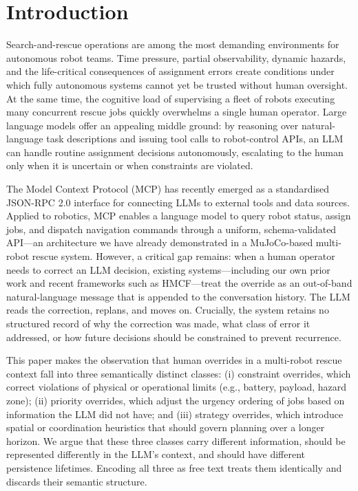 \section{Introduction}

Search-and-rescue operations are among the most demanding environments for autonomous robot teams. Time pressure, partial observability, dynamic hazards, and the life-critical consequences of assignment errors create conditions under which fully autonomous systems cannot yet be trusted without human oversight. At the same time, the cognitive load of supervising a fleet of robots executing many concurrent rescue jobs quickly overwhelms a single human operator. Large language models offer an appealing middle ground: by reasoning over natural-language task descriptions and issuing tool calls to robot-control APIs, an LLM can handle routine assignment decisions autonomously, escalating to the human only when it is uncertain or when constraints are violated.

The Model Context Protocol (MCP) has recently emerged as a standardised JSON-RPC 2.0 interface for connecting LLMs to external tools and data sources. Applied to robotics, MCP enables a language model to query robot status, assign jobs, and dispatch navigation commands through a uniform, schema-validated API—an architecture we have already demonstrated in a MuJoCo-based multi-robot rescue system. However, a critical gap remains: when a human operator needs to correct an LLM decision, existing systems—including our own prior work and recent frameworks such as HMCF—treat the override as an out-of-band natural-language message that is appended to the conversation history. The LLM reads the correction, replans, and moves on. Crucially, the system retains no structured record of why the correction was made, what class of error it addressed, or how future decisions should be constrained to prevent recurrence.

This paper makes the observation that human overrides in a multi-robot rescue context fall into three semantically distinct classes: (i) constraint overrides, which correct violations of physical or operational limits (e.g., battery, payload, hazard zone); (ii) priority overrides, which adjust the urgency ordering of jobs based on information the LLM did not have; and (iii) strategy overrides, which introduce spatial or coordination heuristics that should govern planning over a longer horizon. We argue that these three classes carry different information, should be represented differently in the LLM's context, and should have different persistence lifetimes. Encoding all three as free text treats them identically and discards their semantic structure.

